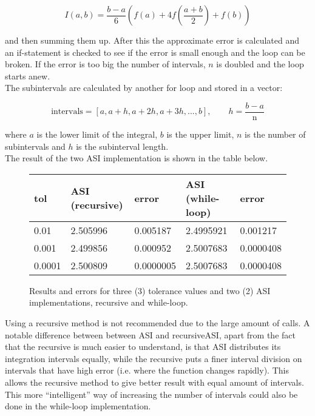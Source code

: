\documentclass[paper=a4, fontsize=11pt]{article} %
\begin{document}
$$ I(a,b) = \frac{b-a}{6} \left (f(a)+4f\left(\frac{a+b}{2}\right) +f(b) \right )$$

and then summing them up. After this the approximate error is calculated and an if-statement is checked to see if the error is small enough and the loop can be broken. If the error is too big the number of intervals, $n$ is doubled and the loop starts anew.\\

The subintervals are calculated by another for loop and stored in a vector: 

$$ \textrm{intervals} = [ a, a+h, a+2h,a+3h,..., b ], \qquad   h = \frac{b-a}{\textrm{n}}$$

where $a$ is the lower limit of the integral, $b$ is the upper limit, $n$ is the number of subintervals and $h$ is the subinterval length.\\

The result of the two ASI implementation is shown in the table below.

 \begin{figure}[htbp]
 \begin{center}
   \begin{tabular}{ l || l  l |  l  l }
     tol & ASI (recursive) & error  & ASI (while-loop) & error \\ \hline
     0.01     & 2.505996 & 0.005187   & 2.4995921 & 0.001217\\ %
     0.001   & 2.499856 & 0.000952   & 2.5007683 & 0.0000408\\
     0.0001 & 2.500809 & 0.0000005  & 2.5007683 & 0.0000408\\  %
   \end{tabular}
 \end{center}
 \caption[table]{Results and errors for three (3) tolerance values and two (2) ASI implementations, recursive and while-loop.}
 	\label{fig:21}
 \end{figure}

Using a recursive method is not recommended due to the large amount of calls. A notable difference between between ASI and recursiveASI, apart from the fact that the recursive is much easier to understand, is that ASI distributes its integration intervals equally, while the recursive puts a finer interval division on intervals that have high error (i.e. where the function changes rapidly). This allows the recursive method to give better result with equal amount of intervals. This more ``intelligent'' way of increasing the number of intervals could also be done in the while-loop implementation.
\end{document}
